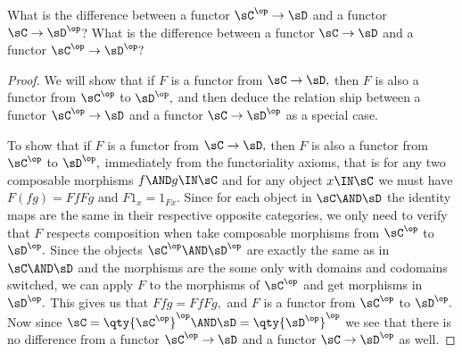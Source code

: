 \documentclass[main.tex]{subfiles}
\begin{document}
\begin{exercise}
	What is the difference between a functor
	$ \sC^{\op}\to \sD $ and a functor $ \sC\to \sD^{\op} $? What is the
	difference between a functor  $ \sC \to \sD $ and a functor $ \sC^{\op}\to \sD^{\op}?$
\end{exercise}

\begin{proof}
	We will show that if $ F $ is a functor from $ \sC\to\sD,$ then $ F $ is
	also a functor from $ \sC^\op $ to $ \sD^\op,$ and then deduce the relation
	ship between a functor $ \sC^{\op}\to \sD $ and a functor $ \sC\to
	\sD^{\op}$ as a special case.

	To show that if $ F $ is a functor from $ \sC\to\sD,$ then $ F $ is
	also a functor from $ \sC^\op $ to $ \sD^\op,$
	immediately from the functoriality axioms, that is for any two composable
	morphisms $ f\AND g \IN\sC $ and for any object $ x\IN\sC $ we must have
	$F(fg)=FfFg$ and $ F1_x=1_{Fx}.$ Since for each object in $ \sC\AND \sD $
	the identity maps are the same in their respective opposite categories, we
	only need to verify that $ F $ respects composition when take composable
	morphisms from $\sC^\op $ to $ \sD^\op.$ Since the objects  $ \sC^\op
	\AND\sD^\op$ are exactly the same as in $ \sC\AND \sD$ and the morphisms
	are the some only with domains and codomains switched, we can apply $ F $
	to the morphisms of $ \sC^\op $ and get morphisms in $ \sD^\op.$ This gives
	us that	$ Ffg=FfFg, $ and $ F $ is a functor from $ \sC^\op  $ to $
	\sD^\op. $ Now since $ \sC=\qty{\sC^\op}^\op \AND \sD=\qty{\sD^\op}^\op$ we
	see that there is no difference from a functor $ \sC^{\op} \to \sD $ and a
	functor $ \sC\to \sD^{\op}  $ as well.
\end{proof}
\end{document}
